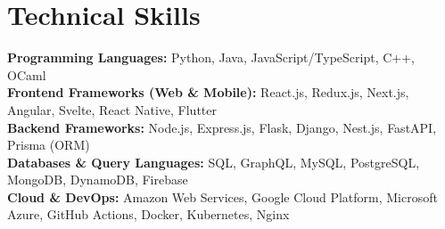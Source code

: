 \documentclass[letterpaper,10pt]{article}
\begin{document}
\section{Technical Skills}
\begin{itemize}[leftmargin=0.15in, label={}]
\small{\item{
    \textbf{Programming Languages:} Python, Java, JavaScript/TypeScript, C++, OCaml \\
    \vspace{2pt}
    \textbf{Frontend Frameworks (Web \& Mobile):} React.js, Redux.js, Next.js, Angular, Svelte, React Native, Flutter \\
    \vspace{2pt}
    \textbf{Backend Frameworks:} Node.js, Express.js, Flask, Django, Nest.js, FastAPI, Prisma (ORM) \\
    \vspace{2pt}
    \textbf{Databases \& Query Languages:} SQL, GraphQL, MySQL, PostgreSQL, MongoDB, DynamoDB, Firebase \\
    \vspace{2pt}
    \textbf{Cloud \& DevOps:} Amazon Web Services, Google Cloud Platform, Microsoft Azure, GitHub Actions, Docker, Kubernetes, Nginx
}}
\end{itemize}



\end{document}
